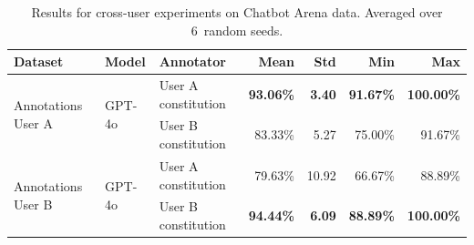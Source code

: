 \begin{table}[H]
\centering
\caption{Results for cross-user experiments on Chatbot Arena data. Averaged over 6~random seeds.}
\label{tab:chatbot_arena_cross_user_num_ersults}
\begin{tabularx}{\textwidth}{lllrrrr}
\toprule
\textbf{Dataset} & \textbf{Model} & \textbf{Annotator} & \textbf{Mean} & \textbf{Std} & \textbf{Min} & \textbf{Max} \\
\midrule
\multirow[t]{2}{*}{Annotations User A} & \multirow[t]{2}{*}{GPT-4o} & User A constitution & \textbf{93.06\%} & \textbf{3.40} & \textbf{91.67\%} & \textbf{100.00\%} \\
 &  & User B constitution & 83.33\% & 5.27 & 75.00\% & 91.67\% \\
\multirow[t]{2}{*}{Annotations User B} & \multirow[t]{2}{*}{GPT-4o} & User A constitution & 79.63\% & 10.92 & 66.67\% & 88.89\% \\
 &  & User B constitution & \textbf{94.44\%} & \textbf{6.09} & \textbf{88.89\%} & \textbf{100.00\%} \\
\bottomrule
\end{tabularx}
\end{table}
